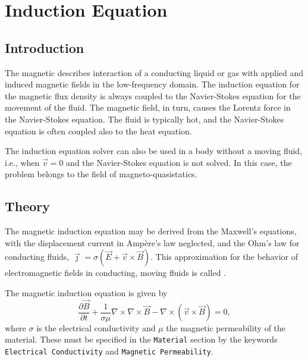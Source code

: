 \chapter{Induction Equation}
\noindent
{}

\section{Introduction}

The magnetic  describes interaction of a conducting
liquid or gas with applied and induced magnetic fields in the low-frequency
domain. The induction equation for the magnetic flux density is always coupled
to the Navier-Stokes equation for the movement of the fluid. The magnetic
field, in turn, causes the Lorentz force in the Navier-Stokes equation. The
fluid is typically hot, and the Navier-Stokes equation is often coupled also
to the heat equation.

The induction equation solver can also be used in a body without a moving
fluid, i.e., when $\vec{v}=0$ and the Navier-Stokes equation is not solved.
In this case, the problem belongs to the field of magneto-quasistatics.

\section{Theory}

The magnetic induction equation may be derived from the Maxwell's equations,
with the displacement current in Amp\`{e}re's law neglected, and the Ohm's law
for conducting fluids,
$\vec{\jmath} = \sigma ( \vec{E} + \vec{v}\times\vec{B} )$. This approximation
for the behavior of electromagnetic
fields in conducting, moving fluids is called .

The magnetic induction equation is given by
\begin{equation}
\frac{\partial \vec{B}}{\partial t} + \frac{1}{\sigma\mu}\nabla\times\nabla\times \vec{B} - 
\nabla\times(\vec{v}\times \vec{B}) = 0,\label{induction}
\end{equation}
where $\sigma$ is the electrical conductivity and
$\mu$ the magnetic permeability of the material. These must be specified in the
{\tt Material} section by the
keywords {\tt Electrical Conductivity} and {\tt Magnetic Permeability}.

